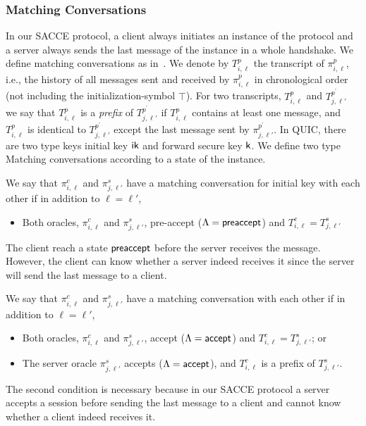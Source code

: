 \subsubsection{Matching Conversations}
In our SACCE protocol, a client always initiates an
instance of the protocol and a server always sends the
last message of the instance in a whole handshake.
We define matching conversations as in~\cite{JKSS12:ACCE}.
We denote by $T^p_{i,\ell}$ the transcript of
$\pi^p_{i,\ell}$, i.e., the history of all messages sent
and received by $\pi^p_{i,\ell}$ in chronological order
(not including the initialization-symbol $\top$).
For two transcripts, $T^p_{i,\ell}$ and
$T^{p^{\prime}}_{j,\ell'}$ we say that $T^p_{i,\ell}$
is a \textit{prefix} of $T^{p^{\prime}}_{j,\ell'}$ if
$T^p_{i,\ell}$ contains at least one message, and
$T^p_{i,\ell}$ is identical to
$T^{p^{\prime}}_{j,\ell'}$ except the last message sent
by $\pi^{p^{\prime}}_{j,\ell'}$.
In QUIC, there are two type keys initial key $\mathsf{ik}$ and
forward secure key $\mathsf{k}$.
We define two type Matching conversations according to
a state of the instance.

\begin{definition}
 We say that $\pi^c_{i,\ell}$ and $\pi^s_{j,\ell'}$ have
 a matching conversation for initial key with each other if
 in addition to $\ell=\ell'$,
 \begin{itemize}
  \item{Both oracles, $\pi^c_{i, \ell}$ and
  $\pi^s_{j,\ell'}$, pre-accept ($\Lambda = \mathsf{preaccept}$) and
  $T^c_{i,\ell} = T^s_{j,\ell'}$}
 \end{itemize}
\end{definition}
\begin{remark}
 The client reach a state $\mathsf{preaccept}$ before the
 server receives the message. However, the client can know whether
 a server indeed receives it since the server will send the
 last message to a client.
\end{remark}
\begin{definition}
 We say that $\pi^c_{i,\ell}$ and $\pi^s_{j,\ell'}$ have
 a matching conversation with each other if in addition
 to $\ell=\ell'$,
 \begin{itemize}
  \item{Both oracles, $\pi^c_{i, \ell}$ and
  $\pi^s_{j,\ell'}$, accept ($\Lambda = \mathsf{accept}$) and
  $T^c_{i,\ell} = T^s_{j,\ell'}$; or}

  \item{The server oracle $\pi^s_{j, \ell'}$ accepts
  ($\Lambda = \mathsf{accept}$),
  and $T^c_{i,\ell}$ is a prefix of $T^s_{j,\ell'}$.}
 \end{itemize}
\end{definition}
\begin{remark}
 The second condition is necessary because in our SACCE
 protocol a server accepts a session before sending the
 last message to a client and cannot know whether a
 client indeed receives it.
\end{remark}

